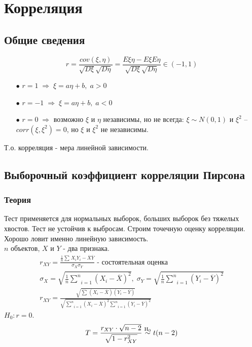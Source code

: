 \chapter{Корреляция}\label{cha:corr}

\section{Общие сведения}\label{cha:corr/sec:basic}

$$r = \frac{cov (\xi, \eta)}{\sqrt{D \xi} \sqrt{D \eta}} = \frac{E \xi \eta - E \xi E \eta}{\sqrt{D \xi} \sqrt{D \eta}} \in (-1,1)$$
\begin{itemize}
	\item[$\bullet$] $r = 1 \; \Rightarrow \; \xi = a \eta + b, \; a > 0$
	\item[$\bullet$] $r = -1 \; \Rightarrow \; \xi = a \eta + b, \; a < 0$
	\item[$\bullet$] $r = 0 \; \Rightarrow$ возможно $\xi$ и $\eta$ независимы, но не всегда: $\xi \sim N(0,1)$ и $\xi^2$ -- $corr (\xi, \xi^2) = 0$, но $\xi$ и $\xi^2$ не независимы. 
\end{itemize}
Т.о. корреляция - мера линейной зависимости.

\section{Выборочный коэффициент корреляции Пирсона}\label{cha:corr/sec:pirson}

\subsection*{Теория}\label{cha:corr/sec:pirson/subsec:theory}

Тест применяется для нормальных выборок, больших выборок без тяжелых хвостов. Тест не устойчив к выбросам. Строим точечную оценку корреляции. Хорошо ловит именно линейную зависимость.\\

$n$ объектов, $X$ и $Y$ - два признака.
$$\begin{gathered}
	r_{XY} = \frac{\frac{1}{n} \underset{}{\overset{}{\sum}}X_i Y_i - \overline{X} \overline{Y}}{\sigma_X \sigma_Y} \text{ - состоятельная оценка} \\
	\sigma_X = \sqrt{\frac{1}{n}\underset{i=1}{\overset{n}{\sum}}(X_i - \overline{X})^2}, \; \sigma_Y = \sqrt{\frac{1}{n}\underset{i=1}{\overset{n}{\sum}}(Y_i - \overline{Y})^2} \\
	r_{XY} = \frac{\sqrt{\underset{}{\overset{}{\sum}}(X_i - \overline{X})(Y_i - \overline{Y})}}{\sqrt{\underset{i=1}{\overset{n}{\sum}}(X_i - \overline{X})^2 \underset{i=1}{\overset{n}{\sum}}(Y_i - \overline{Y})^2}}
\end{gathered}$$
$H_0 : r = 0$.
$$T = \frac{r_{XY} \cdot \sqrt{n-2}}{\sqrt{1 - r_{XY}^2}} \mathrel{\stackrel{\rm H_0}\sim} t(n-2)$$

